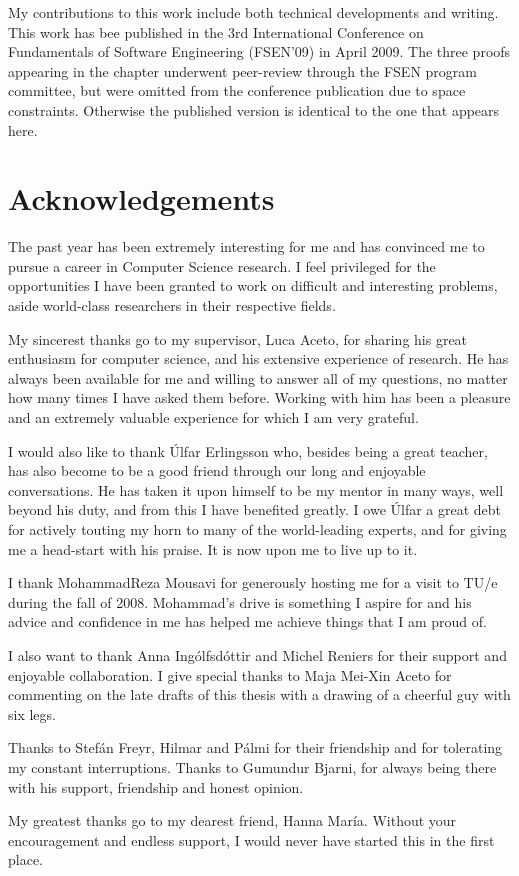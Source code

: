 My contributions to this work include both technical developments and writing.
This work has bee published in the 3rd International Conference on
Fundamentals of Software Engineering (FSEN'09) in April 2009. The three proofs
appearing in the chapter underwent peer-review through the FSEN program committee,
but were omitted from the conference publication due to space constraints. Otherwise
the published version is identical to the one that appears here.


\section{Acknowledgements}

The past year has been extremely interesting for me and has convinced me to 
pursue a career in Computer Science research. I feel privileged for the opportunities
I have been granted to work on difficult and interesting problems, aside world-class
researchers in their respective fields.

My sincerest thanks go to my supervisor, Luca Aceto, for sharing his great
enthusiasm for computer science, and his extensive experience of research. 
He has always been available for me and willing to answer all of my questions,
no matter how many times I have asked them before.
Working with him has been a pleasure and an extremely valuable experience for which
I am very grateful.

I would also like to thank {\'U}lfar Erlingsson who, besides being a great teacher,
has also become to be a good friend through our long and enjoyable conversations.
He has taken it upon himself to be my mentor in many ways, well beyond his duty, 
and from this I have benefited greatly.
I owe {\'U}lfar a great debt for actively touting my horn to many of the world-leading
experts, and for giving me a head-start with his praise. It is now upon me to live up to it.

I thank MohammadReza Mousavi for generously hosting me for a visit
to TU/e during the fall of 2008. Mohammad's drive is something I aspire for
and his advice and confidence in me has helped me achieve things that I am
proud of.

I also want to thank Anna Ing{\'o}lfsd{\'o}ttir and Michel Reniers for their
support and enjoyable collaboration. I give special thanks to Maja Mei-Xin Aceto
for commenting on the late drafts of this thesis with a drawing of a cheerful 
guy with six legs.

Thanks to Stef{\'a}n Freyr, Hilmar and P{\'a}lmi for their friendship and for
tolerating my constant interruptions. Thanks to Gu\dh{}mundur Bjarni, for always
being there with his support, friendship and honest opinion.

My greatest thanks go to my dearest friend, Hanna Mar{\'i}a. Without your encouragement
and endless support, I would never have started this in the first place.

